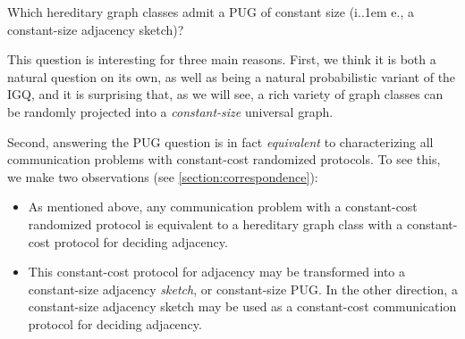 \documentclass{theoretics}
\makeatletter
\newcommand*\ie{i.\kern.1em e.\@\xspace} %
\makeatother
\begin{document}
\begin{question}
\label{question:main} Which hereditary graph classes admit a PUG of constant size (\ie, a
constant-size adjacency sketch)?
\end{question}

This question is interesting for three main reasons. First, we think it is both a natural question
on its own, as well as being a natural probabilistic variant of the IGQ, and it is surprising that,
as we will see, a rich variety of graph classes can be randomly projected into a
\emph{constant-size} universal graph.

Second, answering the PUG question is in fact \emph{equivalent} to characterizing all communication
problems with constant-cost randomized protocols. To see this, we make two observations (see
\cref{section:correspondence}):
\begin{itemize}
\item As mentioned above, any communication problem with a constant-cost randomized protocol is
equivalent to a hereditary graph class with a constant-cost protocol for deciding adjacency.
\item This constant-cost protocol for adjacency may be transformed into a constant-size adjacency
\emph{sketch}, or constant-size PUG. In the other direction, a constant-size
adjacency sketch may be used as a constant-cost communication protocol for deciding adjacency.
\end{itemize}
\end{document}
